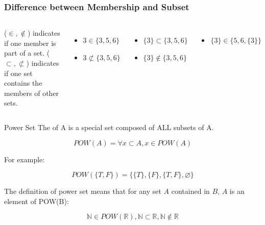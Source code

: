 \begin{frame}
  \frametitle{Difference between Membership and Subset}

  \begin{columns}[T]
     ($\in, \notin$) indicates if one member is part of a set.  ($\subset, \not\subset$) indicates if one set contains the members of other sets.

  {\larger
  \begin{itemize}
  \item $3 \in \{3,5,6\}$
  \item $3 \not\subset \{3,5,6\}$
  \end{itemize}
  \bigskip

  \begin{itemize}
  \item $\{3\} \subset \{3,5,6\}$
  \item $\{3\} \notin \{3,5,6\}$
  \end{itemize}
  \bigskip

  \begin{itemize}
    \item $\{3\} \in \{5, 6, \{3\}\}$
  \end{itemize}
  }
  \end{columns}
\end{frame}

\begin{frame}{Power Set}
  The  of A is a special set composed of ALL subsets of A.

  \begin{equation*}
    POW(A) = \forall x \subset A, x \in POW(A)
  \end{equation*}

  For example:

  \begin{equation*}
    POW(\{T,F\}) = \{\{T\},\{F\},\{T,F\},\varnothing\}
  \end{equation*}

  The definition of power set means that for any set $A$ contained in $B$, $A$ is an element of POW(B):

  \begin{equation*}
    \mathbb{N} \in POW(\mathbb{R}), \mathbb{N} \subset \mathbb{R}, \mathbb{N} \notin \mathbb{R}
  \end{equation*}
\end{frame}


